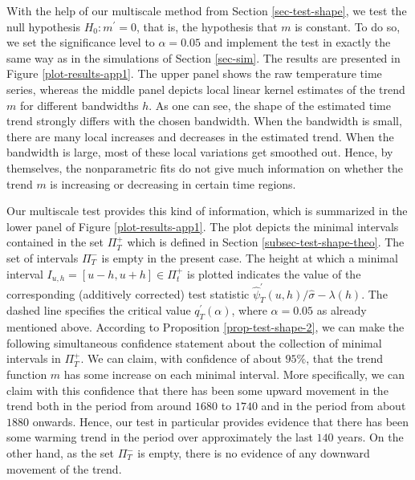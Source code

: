 With the help of our multiscale method from Section \ref{sec-test-shape}, we test the null hypothesis $H_0: m^\prime = 0$, that is, the hypothesis that $m$ is constant. To do so, we set the significance level to $\alpha = 0.05$ and implement the test in exactly the same way as in the simulations of Section \ref{sec-sim}. The results are presented in Figure \ref{plot-results-app1}. The upper panel shows the raw temperature time series, whereas the middle panel depicts local linear kernel estimates of the trend $m$ for different bandwidths $h$. As one can see, the shape of the estimated time trend strongly differs with the chosen bandwidth. When the bandwidth is small, there are many local increases and decreases in the estimated trend. When the bandwidth is large, most of these local variations get smoothed out. Hence, by themselves, the nonparametric fits do not give much information on whether the trend $m$ is increasing or decreasing in certain time regions. 


Our multiscale test provides this kind of information, which is summarized in the lower panel of Figure \ref{plot-results-app1}. The plot depicts the minimal intervals contained in the set $\Pi_T^+$ which is defined in Section \ref{subsec-test-shape-theo}. The set of intervals $\Pi_T^-$ is empty in the present case. The height at which a minimal interval $I_{u,h} = [u-h,u+h] \in \Pi_t^+$ is plotted indicates the value of the corresponding (additively corrected) test statistic $\widehat{\psi}^\prime_T(u,h) / \widehat{\sigma} - \lambda(h)$. The dashed line specifies the critical value $q_T^\prime(\alpha)$, where $\alpha = 0.05$ as already mentioned above. According to Proposition \ref{prop-test-shape-2}, we can make the following simultaneous confidence statement about the collection of minimal intervals in $\Pi_T^+$. We can claim, with confidence of about $95\%$, that the trend function $m$ has some increase on each minimal interval. More specifically, we can claim with this confidence that there has been some upward movement in the trend both in the period from around $1680$ to $1740$ and in the period from about $1880$ onwards. Hence, our test in particular provides evidence that there has been some warming trend in the period over approximately the last $140$ years. On the other hand, as the set $\Pi_T^-$ is empty, there is no evidence of any downward movement of the trend.  




